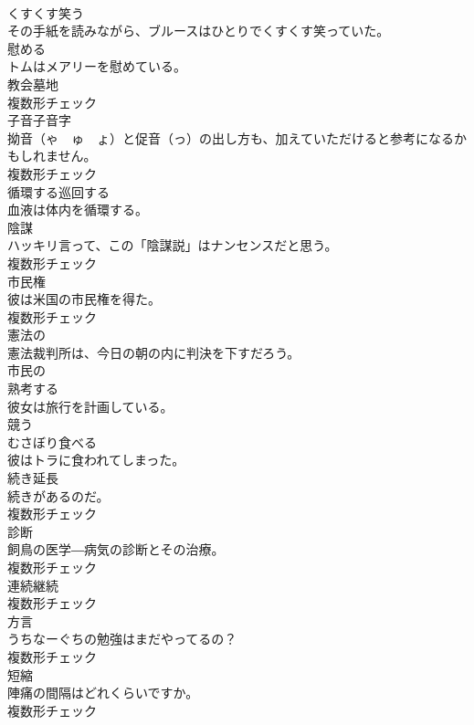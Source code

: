 \documentclass[8pt]{extreport}
\begin{document}
\begin{CJK}{UTF8}{min}
\\	[動詞]	くすくす笑う	
\\	その手紙を読みながら、ブルースはひとりでくすくす笑っていた。	
\\	[動詞]	慰める	
\\	トムはメアリーを慰めている。	
\\	[名詞]	教会墓地	
\\	複数形チェック
\\	[名詞]	子音子音字	
\\	拗音（ゃ　ゅ　ょ）と促音（っ）の出し方も、加えていただけると参考になるかもしれません。	
\\	複数形チェック
\\	[動詞]	循環する巡回する	
\\	血液は体内を循環する。	
\\	[名詞]	陰謀	
\\	ハッキリ言って、この「陰謀説」はナンセンスだと思う。	
\\	複数形チェック
\\	[名詞]	市⺠権	
\\	彼は米国の市民権を得た。	
\\	複数形チェック
\\	[形容詞]	憲法の	
\\	憲法裁判所は、今日の朝の内に判決を下すだろう。	
\\	[形容詞]	市⺠の	
\\	[動詞]	熟考する	
\\	彼女は旅行を計画している。	
\\	[動詞]	競う	
\\	[動詞]	むさぼり食べる	
\\	彼はトラに食われてしまった。	
\\	[名詞]	続き延⻑	
\\	続きがあるのだ。	
\\	複数形チェック
\\	[名詞]	診断	
\\	飼鳥の医学―病気の診断とその治療。	
\\	複数形チェック
\\	[名詞]	連続継続	
\\	複数形チェック
\\	[名詞]	方言	
\\	うちなーぐちの勉強はまだやってるの？	
\\	複数形チェック
\\	[名詞]	短縮	
\\	陣痛の間隔はどれくらいですか。	
\\	複数形チェック

\end{CJK}
\end{document}
